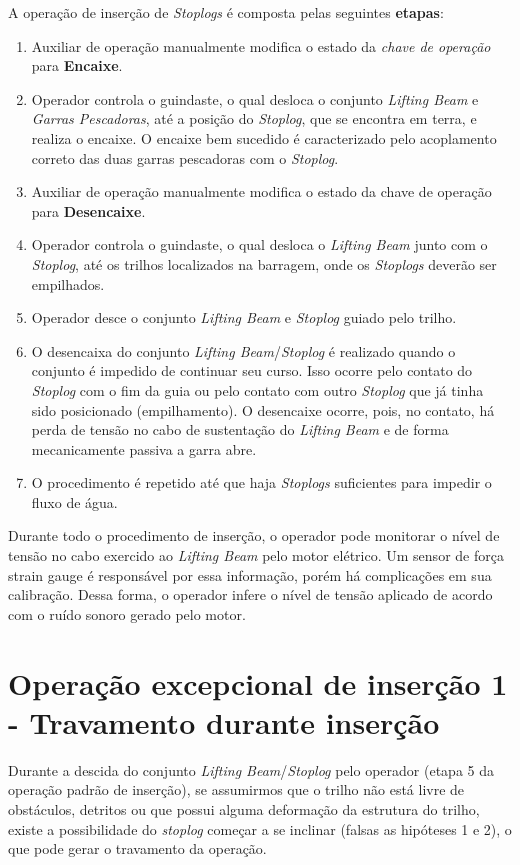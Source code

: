 A operação de inserção de \emph{Stoplogs} é composta pelas seguintes
\textbf{etapas}:
\begin{enumerate}
\item Auxiliar de operação manualmente modifica o estado da \emph{chave de operação} para \textbf{Encaixe}.
\item Operador controla o guindaste, o qual desloca o conjunto \emph{Lifting Beam} e \emph{Garras Pescadoras}, 
até a posição do \emph{Stoplog}, que se encontra em terra, e realiza o encaixe. O encaixe bem sucedido é caracterizado 
pelo acoplamento correto das duas garras pescadoras com o \emph{Stoplog}.
\item Auxiliar de operação manualmente modifica o estado da chave de operação para \textbf{Desencaixe}.
\item Operador controla o guindaste, o qual desloca o \emph{Lifting Beam} junto com o \emph{Stoplog}, até os trilhos localizados na barragem, onde os \emph{Stoplogs} deverão ser empilhados.
\item Operador desce o conjunto \emph{Lifting Beam} e \emph{Stoplog} guiado pelo trilho.
\item O desencaixa do conjunto \emph{Lifting Beam}/\emph{Stoplog} é realizado quando o conjunto é impedido de continuar seu curso. Isso ocorre pelo contato do \emph{Stoplog} com o fim da guia ou pelo contato com outro \emph{Stoplog} que já tinha sido posicionado (empilhamento). O desencaixe ocorre, pois, no contato, há perda de tensão no cabo de sustentação do \emph{Lifting Beam} e de forma mecanicamente passiva a garra abre.
\item O procedimento é repetido até que haja \emph{Stoplogs} suficientes para impedir o fluxo de água.
\end{enumerate}

Durante todo o procedimento de inserção, o operador pode monitorar o nível de
tensão no cabo exercido ao \emph{Lifting Beam} pelo motor elétrico. Um sensor de
força strain gauge é responsável por essa informação, porém há complicações em sua
calibração. Dessa forma, o operador infere o nível de tensão aplicado de acordo
com o ruído sonoro gerado pelo motor.

\section{Operação excepcional de inserção 1 - Travamento durante inserção}

Durante a descida do conjunto  \emph{Lifting Beam}/\emph{Stoplog} pelo operador (etapa 5 da operação padrão de inserção), se assumirmos que o trilho não está livre de obstáculos, detritos ou que possui alguma deformação da estrutura do trilho, existe a possibilidade do \emph{stoplog} começar a se inclinar (falsas as
hipóteses 1 e 2), o que pode gerar o travamento da operação.

